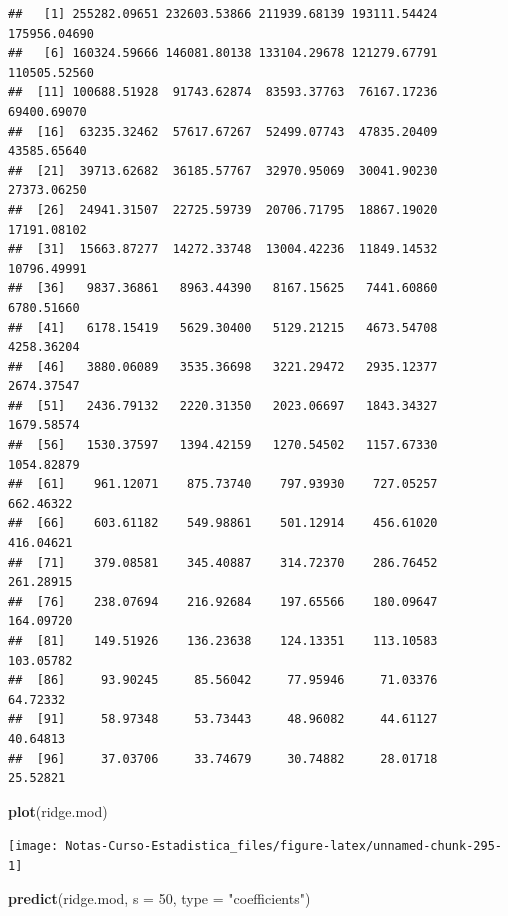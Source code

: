 \documentclass[
  12pt,
]{book}
\newenvironment{Shaded}{\begin{snugshade}}{\end{snugshade}}
\newcommand{\DataTypeTok}[1]{\textcolor[rgb]{0.13,0.29,0.53}{#1}}
\newcommand{\DecValTok}[1]{\textcolor[rgb]{0.00,0.00,0.81}{#1}}
\newcommand{\KeywordTok}[1]{\textcolor[rgb]{0.13,0.29,0.53}{\textbf{#1}}}
\newcommand{\NormalTok}[1]{#1}
\newcommand{\StringTok}[1]{\textcolor[rgb]{0.31,0.60,0.02}{#1}}
\theoremstyle{definition}
\theoremstyle{definition}
\theoremstyle{definition}
\theoremstyle{remark}
\begin{document}
\begin{verbatim}
##   [1] 255282.09651 232603.53866 211939.68139 193111.54424 175956.04690
##   [6] 160324.59666 146081.80138 133104.29678 121279.67791 110505.52560
##  [11] 100688.51928  91743.62874  83593.37763  76167.17236  69400.69070
##  [16]  63235.32462  57617.67267  52499.07743  47835.20409  43585.65640
##  [21]  39713.62682  36185.57767  32970.95069  30041.90230  27373.06250
##  [26]  24941.31507  22725.59739  20706.71795  18867.19020  17191.08102
##  [31]  15663.87277  14272.33748  13004.42236  11849.14532  10796.49991
##  [36]   9837.36861   8963.44390   8167.15625   7441.60860   6780.51660
##  [41]   6178.15419   5629.30400   5129.21215   4673.54708   4258.36204
##  [46]   3880.06089   3535.36698   3221.29472   2935.12377   2674.37547
##  [51]   2436.79132   2220.31350   2023.06697   1843.34327   1679.58574
##  [56]   1530.37597   1394.42159   1270.54502   1157.67330   1054.82879
##  [61]    961.12071    875.73740    797.93930    727.05257    662.46322
##  [66]    603.61182    549.98861    501.12914    456.61020    416.04621
##  [71]    379.08581    345.40887    314.72370    286.76452    261.28915
##  [76]    238.07694    216.92684    197.65566    180.09647    164.09720
##  [81]    149.51926    136.23638    124.13351    113.10583    103.05782
##  [86]     93.90245     85.56042     77.95946     71.03376     64.72332
##  [91]     58.97348     53.73443     48.96082     44.61127     40.64813
##  [96]     37.03706     33.74679     30.74882     28.01718     25.52821
\end{verbatim}

\begin{Shaded}
\begin{Highlighting}[]
\KeywordTok{plot}\NormalTok{(ridge.mod)}
\end{Highlighting}
\end{Shaded}

\begin{center}\texttt{[image: Notas-Curso-Estadistica\_files/figure-latex/unnamed-chunk-295-1]} \end{center}

\begin{Shaded}
\begin{Highlighting}[]
\KeywordTok{predict}\NormalTok{(ridge.mod, }\DataTypeTok{s =} \DecValTok{50}\NormalTok{, }\DataTypeTok{type =} \StringTok{"coefficients"}\NormalTok{)}
\end{Highlighting}
\end{Shaded}
\end{document}
